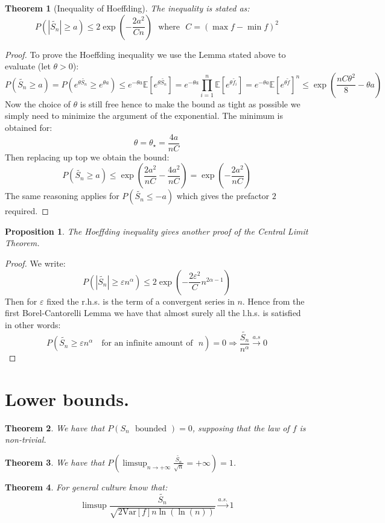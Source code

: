 \documentclass[10pt,a4paper]{book}
\newtheorem{theorem}{Theorem}[section]
\newtheorem{proposition}{Proposition}[section]
\theoremstyle{definition}
\begin{document}
\begin{theorem}[Inequality of Hoeffding]
The inequality is stated as:
\[
P(|\tilde{S_n} | \geq a) \leq 2 \exp(-\frac{2 a^2}{C n}) \mbox{~~where~~} C = (\max f - \min f)^2
\]
\end{theorem}

\begin{proof}
To prove the Hoeffding inequality we use the Lemma stated above to evaluate (let $\theta > 0$):
\[
P(\tilde{S_n} \geq a) = P(e^{\theta \tilde{S_n}} \geq e^{\theta a}) \leq e^{-\theta a} \mathbb{E}[e^{\theta \tilde{S_n}}] = e^{-\theta a} \prod_{i = 1}^n \mathbb{E}[e^{\theta \tilde{f_i}}] = e^{-\theta a} \mathbb{E}[e^{\theta \tilde{f}}]^n \leq \exp(\frac{n C \theta^2}{8} - \theta a)
\]
Now the choice of $\theta$ is still free hence to make the bound as tight as possible we simply need to minimize the argument of the exponential. The minimum is obtained for:
\[
\theta = \theta_\star = \frac{4a}{nC}
\]
Then replacing up top we obtain the bound:
\[
P(\tilde{S_n} \geq a) \leq \exp( \frac{2a^2}{nC} - \frac{4a^2}{nC}) = \exp(-\frac{2a^2}{nC})
\]
The same reasoning applies for $P(\tilde{S_n} \leq -a)$ which gives the prefactor $2$ required. 
\end{proof}

\begin{proposition}
The Hoeffding inequality gives another proof of the Central Limit Theorem.
\end{proposition}

\begin{proof}
We write:
\[
P(|\tilde{S_n}| \geq \varepsilon n^\alpha) \leq 2 \exp(-\frac{2 \varepsilon^2}{C} n^{2 \alpha - 1})
\]
Then for $\varepsilon$ fixed the r.h.s. is the term of a convergent series in $n$. Hence from the first Borel-Cantorelli Lemma we have that almost surely all the l.h.s. is satisfied in other words:
\[
P(\tilde{S_n} \geq \varepsilon n^\alpha \mbox{~~ for an infinite amount of~~} n) = 0 \Rightarrow \frac{\tilde{S_n}}{n^\alpha} \stackrel{a.s}{\longrightarrow} 0
\]
\end{proof}

\section{Lower bounds.}

\begin{theorem}
We have that $P(S_n \mbox{~~bounded~}) = 0$, supposing that the law of $f$ is non-trivial.
\end{theorem}

\begin{theorem}
We have that $P(\limsup_{n \to +\infty} \frac{\tilde{S_n}}{\sqrt{n}} = +\infty) = 1$. 
\end{theorem}

\begin{theorem}
For general culture know that:
\[
\limsup \frac{\tilde{S_n}}{\sqrt{2 \text{Var}[f] n \ln(\ln(n))}} \stackrel{a.s.}{\longrightarrow} 1 
\]
\end{theorem}
\end{document}

